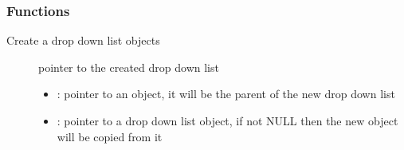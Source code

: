 \documentclass[letterpaper,10pt,english]{sphinxmanual}
\begin{document}
\subsubsection*{Functions}

\begin{fulllineitems}
\label{\detokenize{object-types/ddlist:_CPPv416lv_ddlist_createP8lv_obj_tPK8lv_obj_t}}%
\pysigstartmultiline
{}\label{\detokenize{object-types/ddlist:lv__ddlist_8h_1a0901ca71aec5ebf298c36e42e80d142d}}%
\pysigstopmultiline
Create a drop down list objects \begin{description}
\item[{}] \leavevmode
pointer to the created drop down list 

\item[{}] \leavevmode\begin{itemize}
\item {} 
: pointer to an object, it will be the parent of the new drop down list 

\item {} 
: pointer to a drop down list object, if not NULL then the new object will be copied from it 

\end{itemize}

\end{description}


\end{fulllineitems}

\end{document}
